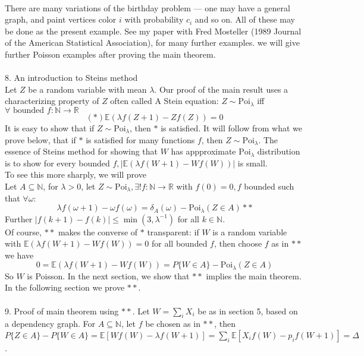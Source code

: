 \documentclass[12pt]{article}
\begin{document}
\\
There are many variations of the birthday problem --- one may have a general graph, and paint vertices color $i$ with probability $c_i$ and so on. All of these may be done as the present example. See my paper with Fred Mosteller (1989 Journal of the American Statistical Association), for many further examples. we will give further Poisson examples after proving the main theorem.\\
\\
8. An introduction to Steins method\\
Let $Z$ be a random variable with mean $\lambda$. Our proof of the main result uses a characterizing property of $Z$ often called A Stein equation: $Z \sim \text{Poi}_{\lambda}$ iff $\forall \text{ bounded } f: \mathbb{N} \rightarrow \mathbb{R}$
$$(\ast)	\mathbb{E}(\lambda f(Z + 1) - Zf(Z)) = 0$$
It is easy to show that if $Z \sim \text{Poi}_{\lambda}$, then $\ast$ is satisfied. It will follow from what we prove below, that if $\ast$ is satisfied for many functions $f$, then $Z \sim \text{Poi}_{\lambda}$. The essence of Steins method for showing that $W$ has appproximate $\text{Poi}_{\lambda}$ distribution is to show for every bounded $f, |\mathbb{E}(\lambda f(W + 1) - Wf(W))|$ is small.\\
To see this more sharply, we will prove\\
Let $A\subseteq\mathbb{N}$, for $\lambda > 0$, let $Z\sim\text{Poi}_{\lambda}, \exists ! f:\mathbb{N} \rightarrow\mathbb{R}$ with $f(0) = 0, f$ bounded such that $\forall \omega:$
$$\lambda f(\omega + 1) - \omega f(\omega) = \delta_A(\omega) - \text{Poi}_{\lambda}(Z \in A)\ast\ast$$
Further $|f(k + 1) - f(k)| \leqslant \min(3, \lambda^{-1})$ for all $k \in \mathbb{N}$.\\
Of course, $\ast\ast$ makes the converse of $\ast$ transparent: if $W$ is a random variable with $\mathbb{E}(\lambda f(W + 1) - Wf(W)) = 0$ for all bounded $f$, then choose $f$ as in $\ast\ast$ we have
$$0 = \mathbb{E}(\lambda f(W + 1) - Wf(W)) = P\{W \in A\} - \text{Poi}_{\lambda}(Z \in A)$$
So $W$ is Poisson. In the next section, we show that $\ast\ast$ implies the main theorem. In the following section we prove $\ast\ast$.\\
\\
9. Proof of main theorem using $\ast\ast$. Let $W = \sum_i X_i$ be as in section 5, based on a dependency graph. For $A \subseteq \mathbb{N}$, let $f$ be chosen as in $\ast\ast$, then $P\{Z\in A\} - P\{W\in A\} = \mathbb{E}[Wf(W) - \lambda f(W + 1)] = \sum_i \mathbb{E}[X_if(W) - p_i f(W + 1)] = \Delta$.\\
\end{document}
